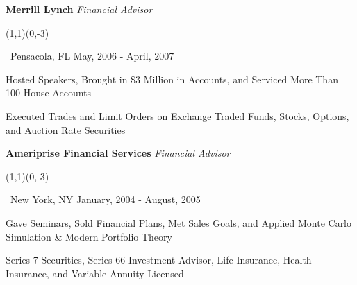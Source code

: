 \documentclass[letterpaper,10pt]{article}
\newcommand{\sbullet}{\,\begin{picture}(1,1)(0,-3)\circle*{3}\end{picture}\ }
\begin{document}
\vspace{-1mm}
{\addtolength{\leftskip}{0mm} \textbf{Merrill Lynch} \emph{Financial Advisor} 
\sbullet Pensacola, FL \hfill{} May, 2006 - April, 2007

\vspace{-2mm} {\addtolength{\leftskip}{0mm}
\begin{itemize}\setlength{\itemsep}{0cm}\setlength{\parskip}{0cm} {\addtolength{\leftskip}{-5mm}
  \item Hosted Speakers, Brought in \$3 Million in Accounts, and Serviced More Than 100 House Accounts
  \item Executed Trades and Limit Orders on Exchange Traded Funds, Stocks, Options, and Auction Rate Securities

}
\end{itemize}

}}

\vspace{-1mm}
{\addtolength{\leftskip}{0mm} \textbf{Ameriprise Financial Services} \emph{Financial Advisor} 
\sbullet New York, NY \hfill{} January, 2004 - August, 2005

\vspace{-2mm} {\addtolength{\leftskip}{0mm}
\begin{itemize}\setlength{\itemsep}{0cm}\setlength{\parskip}{0cm} {\addtolength{\leftskip}{-5mm}
  \item Gave Seminars, Sold Financial Plans, Met Sales Goals, and Applied Monte Carlo Simulation & Modern Portfolio Theory
  \item Series 7 Securities, Series 66 Investment Advisor, Life Insurance, Health Insurance, and Variable Annuity Licensed

}
\end{itemize}

}}
\end{document}
